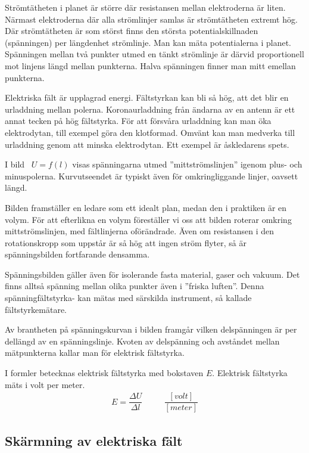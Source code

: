 Strömtätheten i planet är större där resistansen mellan elektroderna är liten.
Närmast elektroderna där alla strömlinjer samlas är strömtätheten extremt hög.
Där strömtätheten är som störst finns den största potentialskillnaden
(spänningen) per längdenhet strömlinje.
Man kan mäta potentialerna i planet.
Spänningen mellan två punkter utmed en tänkt strömlinje är därvid proportionell
mot linjens längd mellan punkterna.
Halva spänningen finner man mitt emellan punkterna.

Elektriska fält är upplagrad energi.
Fältstyrkan kan bli så hög, att det blir en urladdning mellan polerna.
Koronaurladdning från ändarna av en antenn är ett annat tecken på hög
fältstyrka.
För att försvåra urladdning kan man öka elektrodytan, till exempel göra den
klotformad.
Omvänt kan man medverka till urladdning genom att minska elektrodytan.
Ett exempel är åskledarens spets.

I bild~ \(U = f(l)\) visas spänningarna utmed
''mittströmslinjen'' igenom plus- och minuspolerna.
Kurvutseendet är typiskt även för omkringliggande linjer, oavsett längd.

Bilden framställer en ledare som ett idealt plan, medan den i praktiken är en
volym.
För att efterlikna en volym föreställer vi oss att bilden roterar omkring
mittströmslinjen, med fältlinjerna oförändrade.
Även om resistansen i den rotationskropp som uppstår är så hög att ingen ström
flyter, så är spänningsbilden fortfarande densamma.

Spänningsbilden gäller även för isolerande fasta material, gaser och vakuum.
Det finns alltså spänning mellan olika punkter även i ''friska luften''.
Denna spänningfältstyrka- kan mätas med särskilda instrument, så kallade
fältstyrkemätare.

\newpage
Av brantheten på spänningskurvan i bilden framgår vilken delspänningen är per
dellängd av en spänningslinje.
Kvoten av delspänning och avståndet mellan mätpunkterna kallar man för
elektrisk fältstyrka.

I formler betecknas elektrisk fältstyrka med bokstaven \(E\).
Elektrisk fältstyrka mäts i volt per meter.
\[
\begin{array}{ccc}
E=\dfrac{\Delta U}{\Delta l} &\quad& \dfrac{[volt]}{[meter]}
\end{array}
\]
\subsection{Skärmning av elektriska fält}
\label{elektrostatik skärmning}

